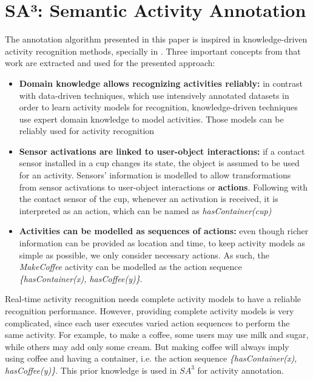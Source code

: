 \section{SA³: Semantic Activity Annotation}
\label{sec:clustering:sa3}

The annotation algorithm presented in this paper is inspired in knowledge-driven activity recognition methods, specially in \cite{Chen2012a}. Three important concepts from that work are extracted and used for the presented approach:

\begin{itemize}
 \item \textbf{Domain knowledge allows recognizing activities reliably:} in contrast with data-driven techniques, which use intensively annotated datasets in order to learn activity models for recognition, knowledge-driven techniques use expert domain knowledge to model activities. Those models can be reliably used for activity recognition
 \item \textbf{Sensor activations are linked to user-object interactions:} if a contact sensor installed in a cup changes its state, the object is assumed to be used for an activity. Sensors' information is modelled to allow transformations from sensor activations to user-object interactions or \textbf{actions}. Following with the contact sensor of the cup, whenever an activation is received, it is interpreted as an action, which can be named as \textit{hasContainer(cup)}
 \item \textbf{Activities can be modelled as sequences of actions:} even though richer information can be provided as location and time, to keep activity models as simple as possible, we only consider necessary actions. As such, the \textit{MakeCoffee} activity can be modelled as the action sequence \textit{\{hasContainer(x), hasCoffee(y)\}}.
\end{itemize}

Real-time activity recognition needs complete activity models to have a reliable recognition performance. However, providing complete activity models is very complicated, since each user executes varied action sequences to perform the same activity. For example, to make a coffee, some users may use milk and sugar, while others may add only some cream. But making coffee will always imply using coffee and having a container, i.e. the action sequence \textit{\{hasContainer(x), hasCoffee(y)\}}. This prior knowledge is used in $SA^3$ for activity annotation.

